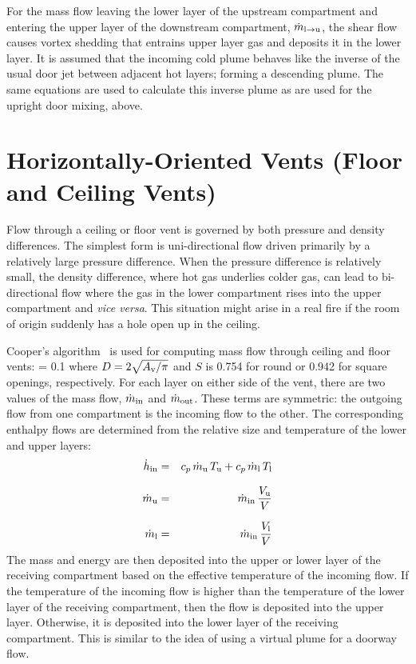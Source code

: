 \documentclass[12pt]{book}
\begin{document}
For the mass flow leaving the lower layer of the upstream compartment and entering the upper layer of the downstream compartment, $\dot{m}_{\rm l \to u}$, the shear flow causes vortex shedding that entrains upper layer gas and deposits it in the lower layer. It is assumed that the incoming cold plume behaves like the inverse of the usual door jet between adjacent hot layers; forming a descending plume.  The same equations are used to calculate this inverse plume as are used for the upright door mixing, above.

\section{Horizontally-Oriented Vents (Floor and Ceiling Vents)}

Flow through a ceiling or floor vent is governed by both pressure and density differences. The simplest form is uni-directional flow driven primarily by a relatively large pressure difference. When the pressure difference is relatively small, the density difference, where hot gas underlies colder gas, can lead to bi-directional flow where the gas in the lower compartment rises into the upper compartment and {\em vice versa}.  This situation might arise in a real fire if the room of origin suddenly has a hole open up in the ceiling.

Cooper's algorithm~\cite{Cooper:1989, Cooper:1990, Cooper:1995} is used for computing mass flow through ceiling and floor vents:
\be
   \dm = 0.1  
\ee
where $D = 2 \sqrt{A_{\rm v} / \pi}$ and $S$ is 0.754 for round or 0.942 for square openings, respectively. For each layer on either side of the vent, there are two values of the mass flow, $\dot{m}_{\rm in}$ and $\dot{m}_{\rm out}$. These terms are symmetric: the outgoing flow from one compartment is the incoming flow to the other. The corresponding enthalpy flows are determined from the relative size and temperature of the lower and upper layers:
\begin{eqnarray}
  \dot{h}_{\rm in} &=& c_p \, \dot{m}_{\rm u} \, T_{\rm u} + c_p \, \dot{m}_{\rm l} \, T_{\rm l} \\[0.1in]
  \dot{m}_{\rm u} &=& \dot{m}_{\rm in} \, \frac{V_{\rm u}}{V} \\[0.1in]
  \dot{m}_{\rm l} &=& \dot{m}_{\rm in} \, \frac{V_{\rm l}}{V}
\end{eqnarray}
The mass and energy are then deposited into the upper or lower layer of the receiving compartment based on the effective temperature of the incoming flow. If the temperature of the incoming flow is higher than the temperature of the lower layer of the receiving compartment, then the flow is deposited into the upper layer. Otherwise, it is deposited into the lower layer of the receiving compartment. This is similar to the idea of using a virtual plume for a doorway flow.
\end{document}
